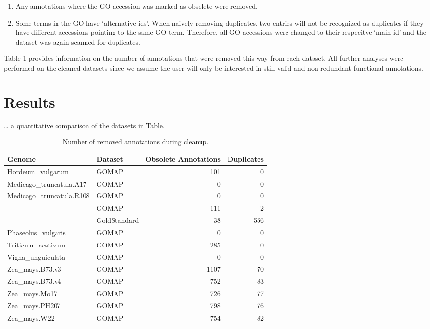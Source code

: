 \documentclass[utf8]{frontiersSCNS}
\providecommand{\tightlist}{%
  \setlength{\itemsep}{0pt}\setlength{\parskip}{0pt}}
\begin{document}
\begin{enumerate}
\def\labelenumi{\arabic{enumi}.}
\tightlist
\item
  Any annotations where the GO accession was marked as obsolete were removed.
\item
  Some terms in the GO have `alternative ids'. When naively removing duplicates, two entries will not be recognized as duplicates if they have different accessions pointing to the same GO term. Therefore, all GO accessions were changed to their respecitve `main id' and the dataset was again scanned for duplicates.
\end{enumerate}

Table 1 provides information on the number of annotations that were removed this way from each dataset.
All further analyses were performed on the cleaned datasets since we assume the user will only be interested in still valid and non-redundant functional annotations.

\hypertarget{results}{%
\section{Results}\label{results}}

\ldots{} a quantitative comparison of the datasets in Table.

\begin{table}[t]

\caption{\label{tab:cleanup-table}Number of removed annotations during cleanup.}
\centering
\begin{tabular}{llrr}
\toprule
Genome & Dataset & Obsolete Annotations & Duplicates\\
\midrule
\rowcolor{gray!6}  Hordeum\_vulgarum & GOMAP & 101 & 0\\
\cmidrule{1-4}
Medicago\_truncatula.A17 & GOMAP & 0 & 0\\
\cmidrule{1-4}
\rowcolor{gray!6}  Medicago\_truncatula.R108 & GOMAP & 0 & 0\\
\cmidrule{1-4}
 & GOMAP & 111 & 2\\

\rowcolor{gray!6}  \multirow{-2}{*}{\raggedright\arraybackslash Oryza\_sativa} & GoldStandard & 38 & 556\\
\cmidrule{1-4}
Phaseolus\_vulgaris & GOMAP & 0 & 0\\
\cmidrule{1-4}
\rowcolor{gray!6}  Triticum\_aestivum & GOMAP & 285 & 0\\
\cmidrule{1-4}
Vigna\_unguiculata & GOMAP & 0 & 0\\
\cmidrule{1-4}
\rowcolor{gray!6}  Zea\_mays.B73.v3 & GOMAP & 1107 & 70\\
\cmidrule{1-4}
Zea\_mays.B73.v4 & GOMAP & 752 & 83\\
\cmidrule{1-4}
\rowcolor{gray!6}  Zea\_mays.Mo17 & GOMAP & 726 & 77\\
\cmidrule{1-4}
Zea\_mays.PH207 & GOMAP & 798 & 76\\
\cmidrule{1-4}
\rowcolor{gray!6}  Zea\_mays.W22 & GOMAP & 754 & 82\\
\bottomrule
\end{tabular}
\end{table}
\end{document}
